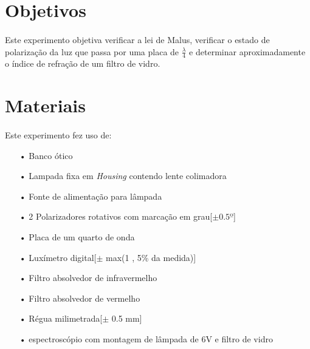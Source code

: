 \documentclass[a4paper,11pt]{article}
\begin{document}




\tableofcontents

\newpage

\section{Objetivos}
\paragraph{} Este experimento objetiva verificar a lei de Malus, verificar o estado de polarização da luz que passa por uma placa de \Large $ \frac{\lambda}{4} $ \normalsize e determinar  aproximadamente o índice de refração de um filtro de vidro.

\section{Materiais}
\paragraph{} Este experimento fez uso de:
\begin{itemize}
	\item[•]Banco ótico
	\item[•]Lampada fixa em \emph{Housing} contendo lente colimadora
	\item[•]Fonte de alimentação para lâmpada
	\item[•]2 Polarizadores rotativos com marcação em grau[$ \pm 0.5 º $]
	\item[•]Placa de um quarto de onda
	\item[•]Luxímetro digital[$ \pm $ max(1 , 5\% da medida)] 
	\item[•]Filtro absolvedor de infravermelho
	\item[•]Filtro absolvedor de vermelho
	\item[•]Régua milimetrada[$ \pm $ 0.5 mm]
	\item[•]espectroscópio com montagem de lâmpada de 6V e filtro de vidro
\end{itemize}
\newpage
\end{document}
